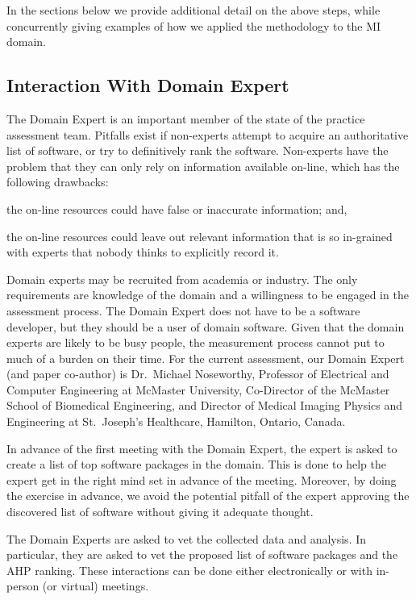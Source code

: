 \documentclass[final, 3p, times, authoryear]{elsarticle}
\begin{document}
In the sections below we provide additional detail on the above steps, while
concurrently giving examples of how we applied the methodology to the MI domain.

\subsection{Interaction With Domain Expert} \label{sec_vet_software_list}

The Domain Expert is an important member of the state of the practice assessment
team. Pitfalls exist if non-experts attempt to acquire an authoritative list of
software, or try to definitively rank the software. Non-experts have the problem
that they can only rely on information available on-line, which has the
following drawbacks:
\begin{inparaenum}[i)]
  \item the on-line resources could have false or inaccurate information; and,
  \item the on-line resources could leave out relevant information that is so
in-grained with experts that nobody thinks to explicitly record it.
\end{inparaenum}

Domain experts may be recruited from academia or industry.  The only
requirements are knowledge of the domain and a willingness to be engaged in the
assessment process.  The Domain Expert does not have to be a software developer,
but they should be a user of domain software.  Given that the domain experts are
likely to be busy people, the measurement process cannot put to much of a burden
on their time.  For the current assessment, our Domain Expert (and paper
co-author) is Dr.\ Michael Noseworthy, Professor of Electrical and Computer
Engineering at McMaster University, Co-Director of the McMaster School of
Biomedical Engineering, and Director of Medical Imaging Physics and Engineering
at St.\ Joseph's Healthcare, Hamilton, Ontario, Canada.  

In advance of the first meeting with the Domain Expert, the expert is asked to
create a list of top software packages in the domain.  This is done to help
the expert get in the right mind set in advance of the meeting.  Moreover,
by doing the exercise in advance, we avoid the potential pitfall of the expert
approving the discovered list of software without giving it adequate thought.

The Domain Experts are asked to vet the collected data and analysis.  In
particular, they are asked to vet the proposed list of software packages and the
AHP ranking.  These interactions can be done either electronically or with
in-person (or virtual) meetings.
\end{document}
